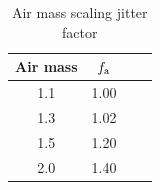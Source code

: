 \documentclass[12pt]{report}
\begin{document}
\begin{table}[!h]
\centering
\caption{Air mass scaling jitter factor}
\label{tab:scaling_airmass}
\begin{tabular}{cccc}
\hline
Air mass & $f_{\rm a}$ & \\
\hline
1.1 & 1.00\\
1.3 & 1.02\\ 
1.5 & 1.20\\ 
2.0 & 1.40\\ 
\hline
\end{tabular}
\end{table}






% 
% 
% 
% 
% 
% 
% 



\cleardoublepage
{}




\end{document}
